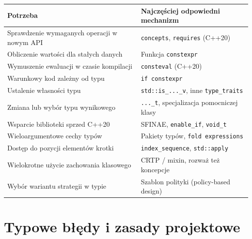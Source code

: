 \begin{center}
\small
\begin{tabular}{|p{5.7cm}|p{6.8cm}|}
\hline
\textbf{Potrzeba} & \textbf{Najczęściej odpowiedni mechanizm} \\
\hline
Sprawdzenie wymaganych operacji w nowym API & \texttt{concepts}, \texttt{requires} (C++20) \\
\hline
Obliczenie wartości dla stałych danych & Funkcja \texttt{constexpr} \\
\hline
Wymuszenie ewaluacji w czasie kompilacji & \texttt{consteval} (C++20) \\
\hline
Warunkowy kod zależny od typu & \texttt{if constexpr} \\
\hline
Ustalenie własności typu & \texttt{std::is\_...\_v}, inne \texttt{type\_traits} \\
\hline
Zmiana lub wybór typu wynikowego & \texttt{...\_t}, specjalizacja pomocniczej klasy \\
\hline
Wsparcie biblioteki sprzed C++20 & SFINAE, \texttt{enable\_if}, \texttt{void\_t} \\
\hline
Wieloargumentowe cechy typów & Pakiety typów, \texttt{fold expressions} \\
\hline
Dostęp do pozycji elementów krotki & \texttt{index\_sequence}, \texttt{std::apply} \\
\hline
Wielokrotne użycie zachowania klasowego & CRTP / mixin, rozważ też koncepcje \\
\hline
Wybór wariantu strategii w typie & Szablon polityki (policy-based design) \\
\hline
\end{tabular}
\end{center}

\section{Typowe błędy i zasady projektowe}

